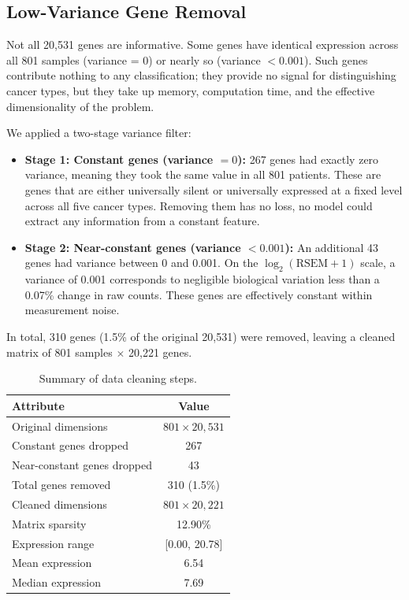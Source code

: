 \documentclass{article}
\begin{document}
\subsection{Low-Variance Gene Removal}
Not all 20{,}531 genes are informative. Some genes have identical expression across all 801 samples (variance = 0) or nearly so (variance $< 0.001$). Such genes contribute nothing to any classification; they provide no signal for distinguishing cancer types, but they take up memory, computation time, and the effective dimensionality of the problem.

We applied a two-stage variance filter:
\begin{itemize}[leftmargin=2em]
\item \textbf{Stage 1: Constant genes (variance $= 0$):} 267 genes had exactly zero variance, meaning they took the same value in all 801 patients. These are genes that are either universally silent or universally expressed at a fixed level across all five cancer types. Removing them has no loss, no model could extract any information from a constant feature.

\item \textbf{Stage 2: Near-constant genes (variance $< 0.001$):} An additional 43 genes had variance between 0 and 0.001. On the $\log_2(\text{RSEM}+1)$ scale, a variance of 0.001 corresponds to negligible biological variation less than a 0.07\% change in raw counts. These genes are effectively constant within measurement noise.
\end{itemize}

In total, 310 genes (1.5\% of the original 20{,}531) were removed, leaving a cleaned matrix of 801 samples $\times$ 20{,}221 genes.

\begin{table}[H]
\caption{Summary of data cleaning steps.}
\label{tab:cleaning}
\begin{center}
\begin{tabular}{lc}
\toprule
\textbf{Attribute} & \textbf{Value}\\
\midrule
Original dimensions & $801 \times 20{,}531$\\
Constant genes dropped & 267\\
Near-constant genes dropped & 43\\
Total genes removed & 310 (1.5\%)\\
Cleaned dimensions & $801 \times 20{,}221$\\
Matrix sparsity & 12.90\%\\
Expression range & [0.00, 20.78]\\
Mean expression & 6.54\\
Median expression & 7.69\\
\bottomrule
\end{tabular}
\end{center}
\end{table}
\end{document}
